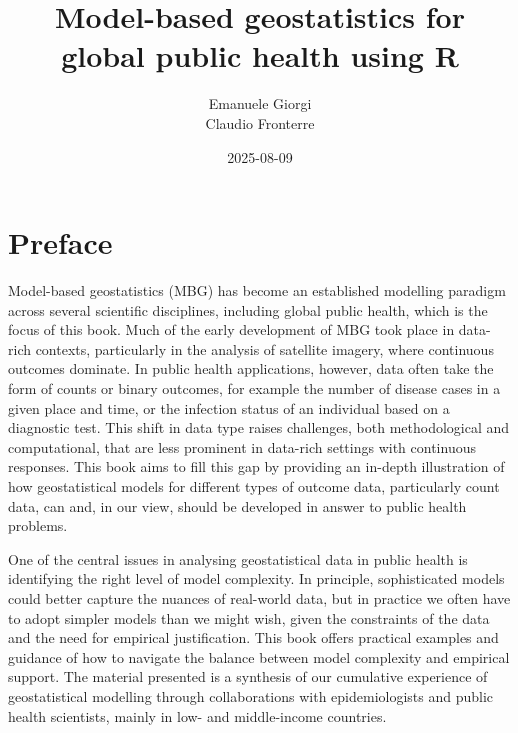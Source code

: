 \documentclass[
  letterpaper,
]{krantz}
\title{Model-based geostatistics for global public health using R}
\author{Emanuele Giorgi\\
Claudio Fronterre}
\date{2025-08-09}
\renewcommand*\contentsname{Table of contents}
\newcommand\contentsname{Table of contents}
\begin{document}
\maketitle

\pagestyle{plain}

\renewcommand*\contentsname{Contents}
{
\hypersetup{linkcolor=}
\setcounter{tocdepth}{2}
\tableofcontents
}


\chapter*{Preface}\label{preface}


Model-based geostatistics (MBG) has become an established modelling
paradigm across several scientific disciplines, including global public
health, which is the focus of this book. Much of the early development
of MBG took place in data-rich contexts, particularly in the analysis of
satellite imagery, where continuous outcomes dominate. In public health
applications, however, data often take the form of counts or binary
outcomes, for example the number of disease cases in a given place and
time, or the infection status of an individual based on a diagnostic
test. This shift in data type raises challenges, both methodological and
computational, that are less prominent in data-rich settings with
continuous responses. This book aims to fill this gap by providing an
in-depth illustration of how geostatistical models for different types
of outcome data, particularly count data, can and, in our view, should
be developed in answer to public health problems.

One of the central issues in analysing geostatistical data in public
health is identifying the right level of model complexity. In principle,
sophisticated models could better capture the nuances of real-world
data, but in practice we often have to adopt simpler models than we
might wish, given the constraints of the data and the need for empirical
justification. This book offers practical examples and guidance of how
to navigate the balance between model complexity and empirical support.
The material presented is a synthesis of our cumulative experience of
geostatistical modelling through collaborations with epidemiologists and
public health scientists, mainly in low- and middle-income countries.
\end{document}
